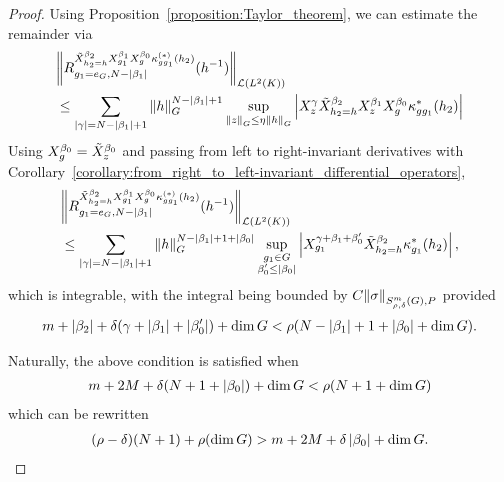 \begin{proof}
    Using Proposition~\ref{proposition:Taylor_theorem},
    we can estimate the remainder via
    \begin{align*}
        &\norm [\Lin {\Lebesgue 2 \CompactGroup}] {%
            \TaylorRemainder {\RightDifferentialOperator [h_2 = h] {\beta_2} \LeftDifferentialOperator [g_1] {\beta_1} \LeftDifferentialOperator [g] {\beta_0} \kappa_{g g_1}^{(*)}(h_2)} {g_1 = e_\Group} {N - \abs {\beta_1}} (h^{-1})
        }\\
        &\leq
        \sum_{\abs \gamma = N - \abs {\beta_1} + 1}
        \norm [\Group] h^{N - \abs {\beta_1} + 1}
        \sup_{\norm [\Group] z \leq \eta \norm [\Group] h}
        \abs {%
            \LeftDifferentialOperator [z] \gamma
            \RightDifferentialOperator [h_2 = h] {\beta_2}
            \LeftDifferentialOperator [z] {\beta_1}
            \LeftDifferentialOperator [g] {\beta_0}
            \kappa^*_{g g_1}(h_2)
        }
    \end{align*}
    Using $\LeftDifferentialOperator [g] {\beta_0} = \RightDifferentialOperator [z] {\beta_0}$
    and passing from left to right-invariant derivatives with Corollary~\ref{corollary:from_right_to_left-invariant_differential_operators},
    \begin{align*}
        &\norm [\Lin {\Lebesgue 2 \CompactGroup}] {%
            \TaylorRemainder {\RightDifferentialOperator [h_2 = h] {\beta_2} \LeftDifferentialOperator [g_1] {\beta_1} \LeftDifferentialOperator [g] {\beta_0} \kappa_{g g_1}^{(*)}(h_2)} {g_1 = e_\Group} {N - \abs {\beta_1}} (h^{-1})
        }\\
        &\leq
        \sum_{\abs \gamma = N - \abs {\beta_1} + 1}
        \norm [\Group] h^{N - \abs {\beta_1} + 1 + \abs {\beta_0}}
        \sup_{\substack {g_1 \in \Group\\ \beta_0' \leq \abs {\beta_0}}}
        \abs {%
        \LeftDifferentialOperator [g_1] {\gamma + \beta_1 + \beta_0'}
            \RightDifferentialOperator [h_2 = h] {\beta_2}
            \kappa^*_{g_1}(h_2)
        },
    \end{align*}
    which is integrable,
    with the integral being bounded by $C {\left\| \sigma \right\|}_{S^{m}_{\rho, \delta}(G), P}$
    provided
    \begin{align*}
        m + \left|{\beta_2}\right| + \delta(\gamma + \left|{\beta_1}\right| + \left|{\beta_0'}\right|) + \dim G
        <
        \rho (N - \left|{\beta_1}\right| + 1 + \left|{\beta_0}\right| + \dim G).
    \end{align*}

    Naturally,
    the above condition is satisfied when
    \begin{align*}
        m + 2 M + \delta(N + 1 + \left|{\beta_0}\right|) + \dim G
        <
        \rho (N + 1 + \dim G)
    \end{align*}
    which can be rewritten
    \begin{align*}
        (\rho - \delta) (N + 1) + \rho (\dim G)
        > m + 2 M + \delta \left|{\beta_0}\right| + \dim G.
    \end{align*}
\end{proof}

